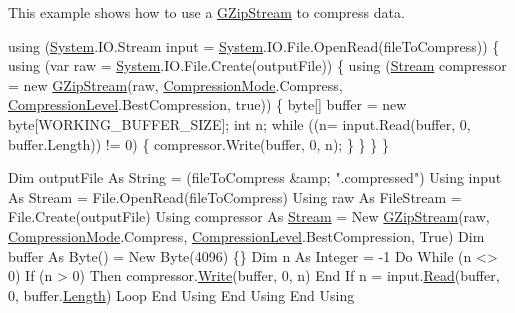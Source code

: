 This example shows how to use a {\ttfamily \mbox{\hyperlink{class_super_tiled2_unity_1_1_ionic_1_1_zlib_1_1_g_zip_stream}{G\+Zip\+Stream}}} to compress data. 
\begin{DoxyCode}
\textcolor{keyword}{using} (\mbox{\hyperlink{namespace_system}{System}}.IO.Stream input = \mbox{\hyperlink{namespace_system}{System}}.IO.File.OpenRead(fileToCompress))
\{
    \textcolor{keyword}{using} (var raw = \mbox{\hyperlink{namespace_system}{System}}.IO.File.Create(outputFile))
    \{
        \textcolor{keyword}{using} (\mbox{\hyperlink{namespace_super_tiled2_unity_1_1_ionic_1_1_zip_a9ced5352c56e7e0fceff15b534073c83aeae835e83c0494a376229f254f7d3392}{Stream}} compressor = \textcolor{keyword}{new} \mbox{\hyperlink{class_super_tiled2_unity_1_1_ionic_1_1_zlib_1_1_g_zip_stream_a509b4683754c1e03e277c5688b75cf54}{GZipStream}}(raw, 
      \mbox{\hyperlink{namespace_super_tiled2_unity_1_1_ionic_1_1_zlib_ad5b7635d92497e1c905e5de82eb1c6b1}{CompressionMode}}.Compress, \mbox{\hyperlink{namespace_super_tiled2_unity_1_1_ionic_1_1_zlib_a20f6771804996c363f454ad9765cd7db}{CompressionLevel}}.BestCompression, \textcolor{keyword}{true}))
        \{
            byte[] buffer = \textcolor{keyword}{new} byte[WORKING\_BUFFER\_SIZE];
            \textcolor{keywordtype}{int} n;
            \textcolor{keywordflow}{while} ((n= input.Read(buffer, 0, buffer.Length)) != 0)
            \{
                compressor.Write(buffer, 0, n);
            \}
        \}
    \}
\}
\end{DoxyCode}
 
\begin{DoxyCode}
Dim outputFile As String = (fileToCompress &amp; \textcolor{stringliteral}{".compressed"})
Using input As Stream = File.OpenRead(fileToCompress)
    Using raw As FileStream = File.Create(outputFile)
    Using compressor As \mbox{\hyperlink{namespace_super_tiled2_unity_1_1_ionic_1_1_zip_a9ced5352c56e7e0fceff15b534073c83aeae835e83c0494a376229f254f7d3392}{Stream}} = New \mbox{\hyperlink{class_super_tiled2_unity_1_1_ionic_1_1_zlib_1_1_g_zip_stream_a509b4683754c1e03e277c5688b75cf54}{GZipStream}}(raw, 
      \mbox{\hyperlink{namespace_super_tiled2_unity_1_1_ionic_1_1_zlib_ad5b7635d92497e1c905e5de82eb1c6b1}{CompressionMode}}.Compress, \mbox{\hyperlink{namespace_super_tiled2_unity_1_1_ionic_1_1_zlib_a20f6771804996c363f454ad9765cd7db}{CompressionLevel}}.BestCompression, True)
        Dim buffer As Byte() = New Byte(4096) \{\}
        Dim n As Integer = -1
        Do While (n <> 0)
            If (n > 0) Then
                compressor.\mbox{\hyperlink{class_super_tiled2_unity_1_1_ionic_1_1_zlib_1_1_g_zip_stream_a49032afb5806563236a5d53841abe2b8}{Write}}(buffer, 0, n)
            End If
            n = input.\mbox{\hyperlink{class_super_tiled2_unity_1_1_ionic_1_1_zlib_1_1_g_zip_stream_a772b5013a585850ffaf8be4aa7f3dbcf}{Read}}(buffer, 0, buffer.\mbox{\hyperlink{class_super_tiled2_unity_1_1_ionic_1_1_zlib_1_1_g_zip_stream_ade637ab4f778c5ee7f5540e00662a645}{Length}})
        Loop
    End Using
    End Using
End Using
\end{DoxyCode}
 


